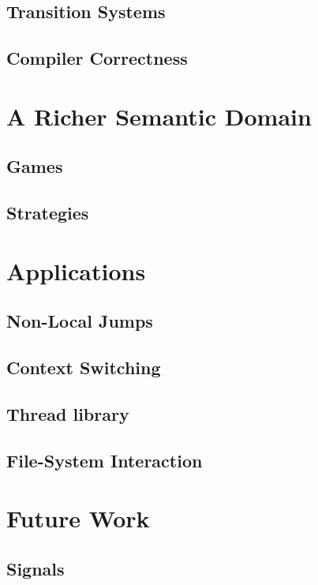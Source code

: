 \documentclass[sigplan,10pt,review,anonymous]{acmart}
\begin{document}
\subsection{Transition Systems}
\subsection{Compiler Correctness}


\section{A Richer Semantic Domain} %

\subsection{Games}
\subsection{Strategies}



\section{Applications} %

\subsection{Non-Local Jumps}
\subsection{Context Switching}
\subsection{Thread library}
\subsection{File-System Interaction}


\section{Future Work} %

\subsection{Signals}
\end{document}
